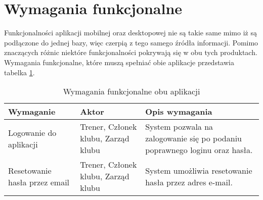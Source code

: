 \documentclass[12pt,twoside]{report}
\begin{document}
\section{Wymagania funkcjonalne}
Funkcjonalności aplikacji mobilnej oraz desktopowej nie są takie same mimo iż są podłączone do jednej bazy, więc czerpią z tego samego źródła informacji. Pomimo znaczących różnic niektóre funkcjonalności pokrywają się w obu tych produktach. 
Wymagania funkcjonalne, które muszą spełniać obie aplikacje przedstawia tabelka \ref{funkcjonalneObuApek}.
\renewcommand{\arraystretch}{1.5}
\begin{table}[h!]
	\centering
\begin{tabular}{|p{4.5cm}|p{4cm}|p{7cm}|}			
	\hline
	Wymaganie & Aktor & Opis wymagania\\
	\hline
	Logowanie do aplikacji& Trener, Członek klubu, Zarząd klubu & System pozwala na zalogowanie się po podaniu poprawnego loginu oraz hasła.\\
	\hline
	Resetowanie hasła przez email & Trener, Członek klubu, Zarząd klubu& System umożliwia resetowanie hasła przez adres e-mail. \\
	\hline
	
\end{tabular}
	\caption{Wymagania funkcjonalne obu aplikacji}
	\label{funkcjonalneObuApek}
\end{table}
\end{document}
